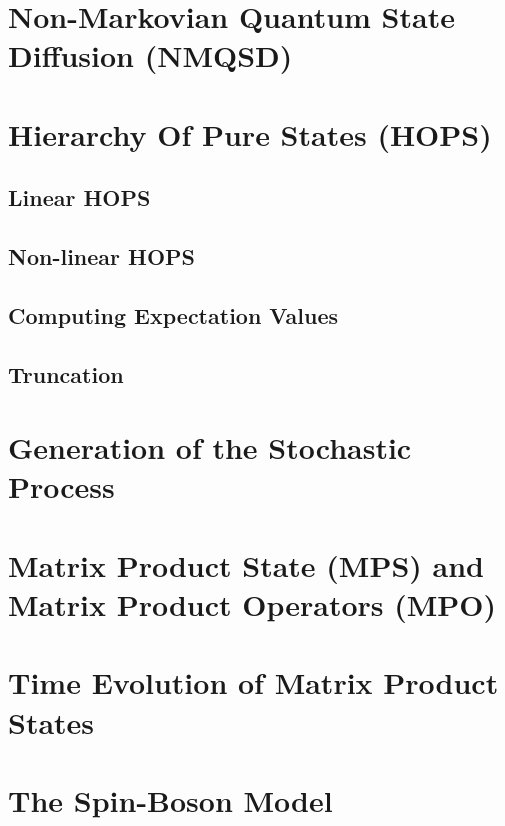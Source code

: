 \section{Non-Markovian Quantum State Diffusion (NMQSD)}

\newpage
\section{Hierarchy Of Pure States (HOPS)}
\label{sec:HOPS_Derivation}
\subsection{Linear HOPS}

\subsection{Non-linear HOPS}

\subsection{Computing Expectation Values}

\subsection{Truncation}

\newpage
\section{Generation of the Stochastic Process}

\newpage
\section{Matrix Product State (MPS) and Matrix Product Operators (MPO)}
\label{sec:MPS_Introduction}

\newpage
\section{Time Evolution of Matrix Product States}

\newpage
\section{The Spin-Boson Model}
